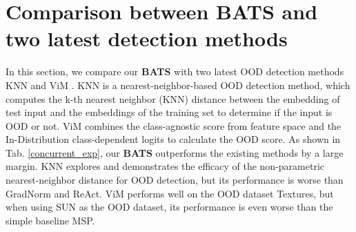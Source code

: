\documentclass{article}
\begin{document}
 {
 \section{Comparison between BATS and two latest detection methods}
 In this section, we compare our \textbf{BATS} with two latest OOD detection methods KNN \cite{sun2022knn} and ViM \cite{wang2022vim}. KNN is a nearest-neighbor-based OOD detection method, which computes the k-th nearest neighbor (KNN) distance between the embedding of test input and the embeddings of the training set to determine if the input is OOD or not. ViM combines the class-agnostic score from feature space and the In-Distribution class-dependent logits to calculate the OOD score. As shown in Tab. \ref{concurrent_exp}, our \textbf{BATS} outperforms the existing methods by a large margin. KNN explores and demonstrates the efficacy of the non-parametric nearest-neighbor distance for OOD detection, but its performance is worse than GradNorm and ReAct. ViM performs well on the OOD dataset Textures, but when using SUN as the OOD dataset, its performance is even worse than the simple baseline MSP.
}
\begin{table}[htbp] 
\caption{OOD detection performance comparison on ResNet-50 on the ImageNet benchmark. All methods are post hoc and can be directly used for pre-trained models. The best results are in Bold.} 
\end{table}
\end{document}
